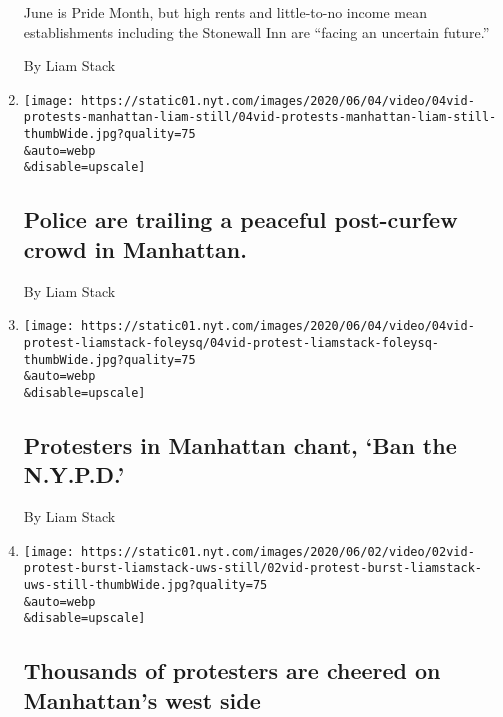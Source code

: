 \begin{enumerate}
  June is Pride Month, but high rents and little-to-no income mean
  establishments including the Stonewall Inn are ``facing an uncertain
  future.''

  By Liam Stack
\item
  \href{/live/2020/george-floyd-protests-photos-videos-06-04/police-are-trailing-a-peaceful-post-curfew-crowd-in-manhattan}{}

  \texttt{[image: https://static01.nyt.com/images/2020/06/04/video/04vid-protests-manhattan-liam-still/04vid-protests-manhattan-liam-still-thumbWide.jpg?quality=75\\\&auto=webp\\\&disable=upscale]}

  \hypertarget{police-are-trailing-a-peaceful-post-curfew-crowd-in-manhattan}{%
  \subsection{Police are trailing a peaceful post-curfew crowd in
  Manhattan.}\label{police-are-trailing-a-peaceful-post-curfew-crowd-in-manhattan}}

  By Liam Stack
\item
  \href{/live/2020/george-floyd-protests-photos-videos-06-04/protesters-in-manhattan-chant-ban-the-nypd}{}

  \texttt{[image: https://static01.nyt.com/images/2020/06/04/video/04vid-protest-liamstack-foleysq/04vid-protest-liamstack-foleysq-thumbWide.jpg?quality=75\\\&auto=webp\\\&disable=upscale]}

  \hypertarget{protesters-in-manhattan-chant-ban-the-nypd}{%
  \subsection{Protesters in Manhattan chant, `Ban the
  N.Y.P.D.'}\label{protesters-in-manhattan-chant-ban-the-nypd}}

  By Liam Stack
\item
  \href{/live/2020/protests-george-floyd-police-06-02/thousands-of-protesters-are-cheered-on-manhattans-west-side}{}

  \texttt{[image: https://static01.nyt.com/images/2020/06/02/video/02vid-protest-burst-liamstack-uws-still/02vid-protest-burst-liamstack-uws-still-thumbWide.jpg?quality=75\\\&auto=webp\\\&disable=upscale]}

  \hypertarget{thousands-of-protesters-are-cheered-on-manhattans-west-side}{%
  \subsection{Thousands of protesters are cheered on Manhattan's west
  side}\label{thousands-of-protesters-are-cheered-on-manhattans-west-side}}


\end{enumerate}
